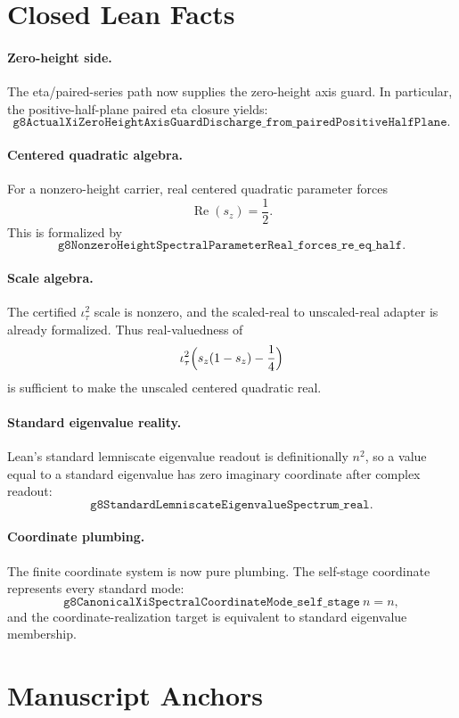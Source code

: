 \documentclass[11pt]{article}
\begin{document}
\section*{Closed Lean Facts}

\paragraph{Zero-height side.}
The eta/paired-series path now supplies the zero-height axis guard.  In
particular, the positive-half-plane paired eta closure yields:
\[
  \texttt{g8ActualXiZeroHeightAxisGuardDischarge\_from\_pairedPositiveHalfPlane}.
\]

\paragraph{Centered quadratic algebra.}
For a nonzero-height carrier, real centered quadratic parameter forces
\[
  \operatorname{Re}(s_z)=\frac12.
\]
This is formalized by
\[
  \texttt{g8NonzeroHeightSpectralParameterReal\_forces\_re\_eq\_half}.
\]

\paragraph{Scale algebra.}
The certified \(\iota_\tau^2\) scale is nonzero, and the scaled-real to
unscaled-real adapter is already formalized.  Thus real-valuedness of
\[
  \iota_\tau^2\Bigl(s_z(1-s_z)-\frac14\Bigr)
\]
is sufficient to make the unscaled centered quadratic real.

\paragraph{Standard eigenvalue reality.}
Lean's standard lemniscate eigenvalue readout is definitionally \(n^2\), so a
value equal to a standard eigenvalue has zero imaginary coordinate after
complex readout:
\[
  \texttt{g8StandardLemniscateEigenvalueSpectrum\_real}.
\]

\paragraph{Coordinate plumbing.}
The finite coordinate system is now pure plumbing.  The self-stage coordinate
represents every standard mode:
\[
  \texttt{g8CanonicalXiSpectralCoordinateMode\_self\_stage}\ n = n,
\]
and the coordinate-realization target is equivalent to standard eigenvalue
membership.

\section*{Manuscript Anchors}
\end{document}
